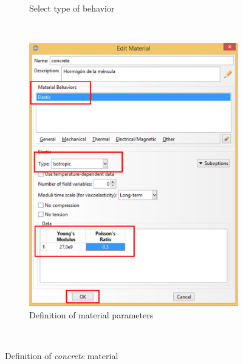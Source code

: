 \begin{enumerate}
\begin{figure}[H]
\begin{subfigure}{0.39\textwidth}
    \caption{Select type of behavior}
    \label{figu14}
  \end{subfigure}
  ~ %
  \begin{subfigure}{0.39\textwidth}
    \includegraphics[width=\textwidth]{./body/images/imagen15.pdf}
    \caption{Definition of material parameters}
    \label{figu15}
  \end{subfigure}
  ~ %
  \caption{Definition of \textit{concrete} material}
\end{figure}


\end{enumerate}
